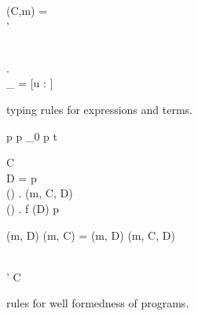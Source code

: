 \begin{figure}[t]
    \vspace{0.5em}

    
    \vspace{0.5em}

    { \andalso \mtype(C,m) = \sigma \to \tau \\
     \andalso \sigma' \stof \sigma }
    {}
    
    \vspace{0.5em}

    { \andalso {}}
    {}
    
    \vspace{0.5em}

    { \andalso {} \\
    \forall {} \in {}. \; \\
    \Gamma_{} = [u \mapsto \CellType :  \in {}]\\
    }
    {  }

  \caption{\RACL{} typing rules for expressions and terms.}
  \label{fig:expr_typing}
\end{figure}

\begin{figure}
  {p \vdash {} \andalso p \vdash \Gamma_0 \andalso
  }
  {p \vdash {} \:  \: t}

  \RuleSpace{}

  {C \vdash {} \\ D = \AnyRefType{} \lor
  p \vdash {} \\
  \forall () \in {} . \: \override(m,
  C, D) \\
  \forall () \in {} . \: f \notin \fields(D) }
  {p \vdash {}}

  \RuleSpace{}

  {\mtype(m, D) \lor \mtype(m, C) = \mtype(m, D)}
  {\override(m, C, D)}
  
  \RuleSpace{}

  {  \\
  \tau' \stof \tau}
  {C \vdash {}}
  \caption{\RACL{} rules for well formedness of programs.}
  \label{fig:wf_typing}
\end{figure}


